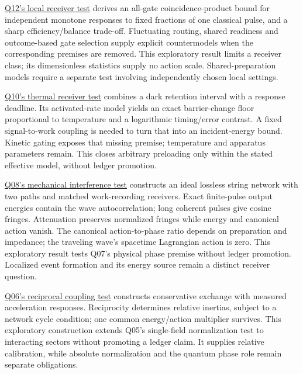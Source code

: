 \documentclass[11pt,a4paper]{article}
\begin{document}
\href{../notes/local-detector-coincidences.md}{Q12's local receiver
test} derives an all-gate coincidence-product bound for independent
monotone responses to fixed fractions of one classical pulse, and a
sharp efficiency/balance trade-off. Fluctuating routing, shared
readiness and outcome-based gate selection supply explicit countermodels
when the corresponding premises are removed. This exploratory result
limits a receiver class; its dimensionless statistics supply no action
scale. Shared-preparation models require a separate test involving
independently chosen local settings.

\href{../notes/thermal-receiver-reliability.md}{Q10's thermal receiver
test} combines a dark retention interval with a response deadline. Its
activated-rate model yields an exact barrier-change floor proportional
to temperature and a logarithmic timing/error contrast. A fixed
signal-to-work coupling is needed to turn that into an incident-energy
bound. Kinetic gating exposes that missing premise; temperature and
apparatus parameters remain. This closes arbitrary preloading only
within the stated effective model, without ledger promotion.

\href{../notes/mechanical-interference-action.md}{Q08's mechanical
interference test} constructs an ideal lossless string network with two
paths and matched work-recording receivers. Exact finite-pulse output
energies contain the wave autocorrelation; long coherent pulses give
cosine fringes. Attenuation preserves normalized fringes while energy
and canonical action vanish. The canonical action-to-phase ratio depends
on preparation and impedance; the traveling wave's spacetime Lagrangian
action is zero. This exploratory result tests Q07's physical phase
premise without ledger promotion. Localized event formation and its
energy source remain a distinct receiver question.

\href{../notes/reciprocal-coupling-normalization.md}{Q06's reciprocal
coupling test} constructs conservative exchange with measured
acceleration responses. Reciprocity determines relative inertias,
subject to a network cycle condition; one common energy/action
multiplier survives. This exploratory construction extends Q05's
single-field normalization test to interacting sectors without promoting
a ledger claim. It supplies relative calibration, while absolute
normalization and the quantum phase role remain separate obligations.
\end{document}
